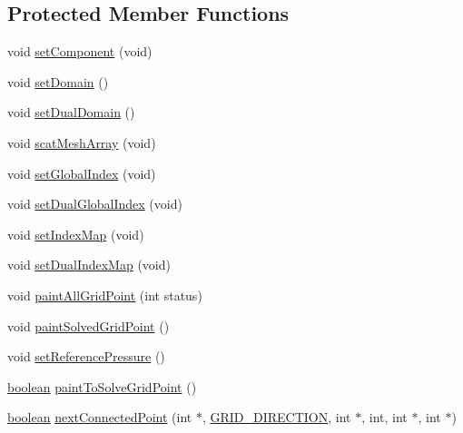 \subsection*{Protected Member Functions}
\begin{DoxyCompactItemize}
\item 
void \hyperlink{class_incompress___solver___smooth___basis_a69f6f20588a4bbba75984288d89b2781}{set\+Component} (void)
\item 
void \hyperlink{class_incompress___solver___smooth___basis_ab983f0caf55ce07522e068911764f184}{set\+Domain} ()
\item 
void \hyperlink{class_incompress___solver___smooth___basis_a2cb736ad63119ddaafb08def2bd9bfd2}{set\+Dual\+Domain} ()
\item 
void \hyperlink{class_incompress___solver___smooth___basis_a7fc402728896d653973e8cbcffa393fc}{scat\+Mesh\+Array} (void)
\item 
void \hyperlink{class_incompress___solver___smooth___basis_a96722a356fc4dcd49a4cdafd08ab5c16}{set\+Global\+Index} (void)
\item 
void \hyperlink{class_incompress___solver___smooth___basis_add73b3231bdd09083d2244fc30b31aa8}{set\+Dual\+Global\+Index} (void)
\item 
void \hyperlink{class_incompress___solver___smooth___basis_af8c95fb72e0dbda27eddebddb2862a41}{set\+Index\+Map} (void)
\item 
void \hyperlink{class_incompress___solver___smooth___basis_a4e33c06383e49eff17051ee0a573db9d}{set\+Dual\+Index\+Map} (void)
\item 
void \hyperlink{class_incompress___solver___smooth___basis_a6c8bba103054da68e38950604bfae0d8}{paint\+All\+Grid\+Point} (int status)
\item 
void \hyperlink{class_incompress___solver___smooth___basis_ad62702c94435bc99095af94ae2a5a2e2}{paint\+Solved\+Grid\+Point} ()
\item 
void \hyperlink{class_incompress___solver___smooth___basis_af56e98eeed1392225a3990fcc12121db}{set\+Reference\+Pressure} ()
\item 
\hyperlink{cdecs_8h_ad048433382a936258fb49e2ec4f148e1}{boolean} \hyperlink{class_incompress___solver___smooth___basis_a10b32a6e970e4da9919e291080d087bb}{paint\+To\+Solve\+Grid\+Point} ()
\item 
\hyperlink{cdecs_8h_ad048433382a936258fb49e2ec4f148e1}{boolean} \hyperlink{class_incompress___solver___smooth___basis_a0aeb30dabdf2a501f6d4d471c73c9341}{next\+Connected\+Point} (int $\ast$, \hyperlink{int_8h_aa7cc507beba6455174c0996f89fdc8c3}{G\+R\+I\+D\+\_\+\+D\+I\+R\+E\+C\+T\+I\+ON}, int $\ast$, int, int $\ast$, int $\ast$)

\end{DoxyCompactItemize}
